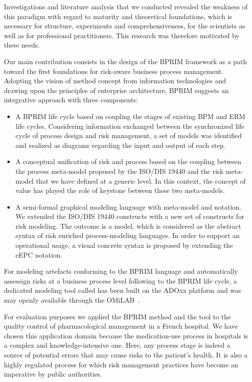 \documentclass[preprint,3p,times,number]{elsarticle}
\begin{document}
Investigations and literature analysis that we conducted revealed the weakness of this paradigm with regard to maturity and theoretical foundations, which is necessary for structure, experiments and comprehensiveness, for the scientists as well as for professional practitioners. This research was therefore motivated by these needs.

Our main contribution consists in the design of the BPRIM framework as a path toward the first foundations for risk-aware business process management. Adopting the vision of method concept from information technologies and drawing upon the principles of enterprise architecture, BPRIM suggests an integrative approach with three components:
\begin{itemize}
    \item A BPRIM life cycle based on coupling the stages of existing BPM and ERM life cycles. Considering information exchanged between the synchronized life cycle of process design and risk management, a set of models was identified and realized as diagrams regarding the input and output of each step.
    \item A conceptual unification of risk and process based on the coupling between the process meta-model proposed by the ISO/DIS 19440 and the risk meta-model that we have defined at a generic level. In this context, the concept of value has played the role of keystone between these two meta-models. 
    \item A semi-formal graphical modeling language with meta-model and notation. We extended the ISO/DIS 19440 constructs with a new set of constructs for risk modeling. The outcome is a model, which is considered as the abstract syntax of risk enriched process-modeling languages. In order to support an operational usage, a visual concrete syntax is proposed by extending the eEPC notation.
\end{itemize}

For modeling artefacts conforming to the BPRIM language and automatically assessign risks at a business process level following to the BPRIM life cycle, a dedicated modeling tool called \adobprim{} has been built on the ADOxx platform and was may openly available through the OMiLAB~\cite{Bork:2019omilab}.

For evaluation purposes we applied the BPRIM method and the \adobprim{} tool to the quality control of pharmacological management in a French hospital. We have chosen this application domain because the medication-use process in hospitals is a complex and knowledge-intensive one. Here, any process stage is indeed a source of potential errors that may cause risks to the patient’s health. It is also a highly regulated process for which risk management practices have become an imperative by public authorities. 
\end{document}
